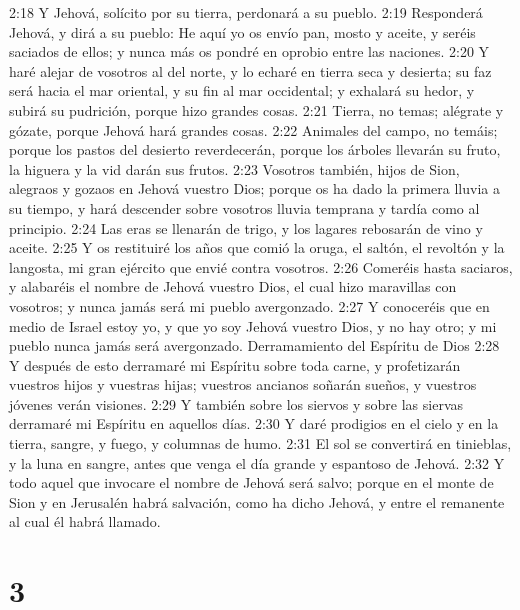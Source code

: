 2:18 Y Jehová, solícito por su tierra, perdonará a su pueblo.  
2:19 Responderá Jehová, y dirá a su pueblo: He aquí yo os envío pan, mosto y aceite, y seréis saciados de ellos; y nunca más os pondré en oprobio entre las naciones.  
2:20 Y haré alejar de vosotros al del norte, y lo echaré en tierra seca y desierta; su faz será hacia el mar oriental, y su fin al mar occidental; y exhalará su hedor, y subirá su pudrición, porque hizo grandes cosas.  
2:21 Tierra, no temas; alégrate y gózate, porque Jehová hará grandes cosas.  
2:22 Animales del campo, no temáis; porque los pastos del desierto reverdecerán, porque los árboles llevarán su fruto, la higuera y la vid darán sus frutos.  
2:23 Vosotros también, hijos de Sion, alegraos y gozaos en Jehová vuestro Dios; porque os ha dado la primera lluvia a su tiempo, y hará descender sobre vosotros lluvia temprana y tardía como al principio.  
2:24 Las eras se llenarán de trigo, y los lagares rebosarán de vino y aceite.  
2:25 Y os restituiré los años que comió la oruga, el saltón, el revoltón y la langosta, mi gran ejército que envié contra vosotros.  
2:26 Comeréis hasta saciaros, y alabaréis el nombre de Jehová vuestro Dios, el cual hizo maravillas con vosotros; y nunca jamás será mi pueblo avergonzado.  
2:27 Y conoceréis que en medio de Israel estoy yo, y que yo soy Jehová vuestro Dios, y no hay otro; y mi pueblo nunca jamás será avergonzado.  
Derramamiento del Espíritu de Dios  
2:28 Y después de esto derramaré mi Espíritu sobre toda carne, y profetizarán vuestros hijos y vuestras hijas; vuestros ancianos soñarán sueños, y vuestros jóvenes verán visiones.  
2:29 Y también sobre los siervos y sobre las siervas derramaré mi Espíritu en aquellos días.  
2:30 Y daré prodigios en el cielo y en la tierra, sangre, y fuego, y columnas de humo.  
2:31 El sol se convertirá en tinieblas, y la luna en sangre, antes que venga el día grande y espantoso de Jehová.  
2:32 Y todo aquel que invocare el nombre de Jehová será salvo; porque en el monte de Sion y en Jerusalén habrá salvación, como ha dicho Jehová, y entre el remanente al cual él habrá llamado. 

\chapter{3}

